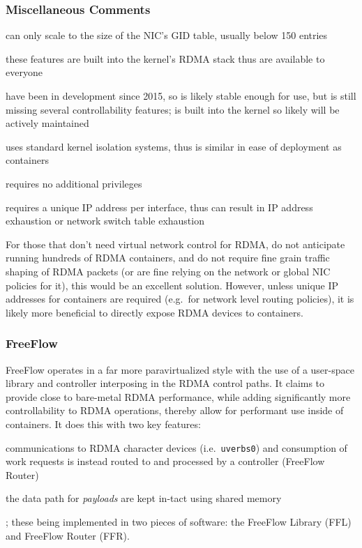 \documentclass[12pt,titlepage]{article}
\begin{document}
\subsubsection*{Miscellaneous Comments}
\begin{description}[nolistsep,font={{\scshape\bfseries}}]
	\item[Scalability Limits] can only scale to the size of the NIC's GID table, usually below 150 entries
	\item[Proprietary] these features are built into the kernel's RDMA stack thus are available to everyone
	\item[Maturity] have been in development since 2015, so is likely stable enough for use, but is still missing several controllability features; is built into the kernel so likely will be actively maintained
	\item[Ease in Deployment] uses standard kernel isolation systems, thus is similar in ease of deployment as containers
	\item[Execution Privileges] requires no additional privileges
	\item[Network Pressure] requires a unique IP address per interface, thus can result in IP address exhaustion or network switch table exhaustion
\end{description}

For those that don't need virtual network control for RDMA, do not anticipate running hundreds of RDMA containers, and do not require fine grain traffic shaping of RDMA packets (or are fine relying on the network or global NIC policies for it), this would be an excellent solution.
However, unless unique IP addresses for containers are required (e.g.\ for network level routing policies), it is likely more beneficial to directly expose RDMA devices to containers.

\subsubsection{FreeFlow}
FreeFlow operates in a far more paravirtualized style with the use of a user-space library and controller interposing in the RDMA control paths.
It claims to provide close to bare-metal RDMA performance, while adding significantly more controllability to RDMA operations, thereby allow for performant use inside of containers.
It does this with two key features:
\begin{enumerate*}[label={(\arabic*)},itemjoin*={{, and }},itemjoin={{, }}]
	\item communications to RDMA character devices (i.e.\ \texttt{uverbs0}) and consumption of work requests is instead routed to and processed by a controller (FreeFlow Router)
	\item the data path for \textit{payloads} are kept in-tact using shared memory
\end{enumerate*};
these being implemented in two pieces of software: the FreeFlow Library (FFL) and FreeFlow Router (FFR).
\end{document}
